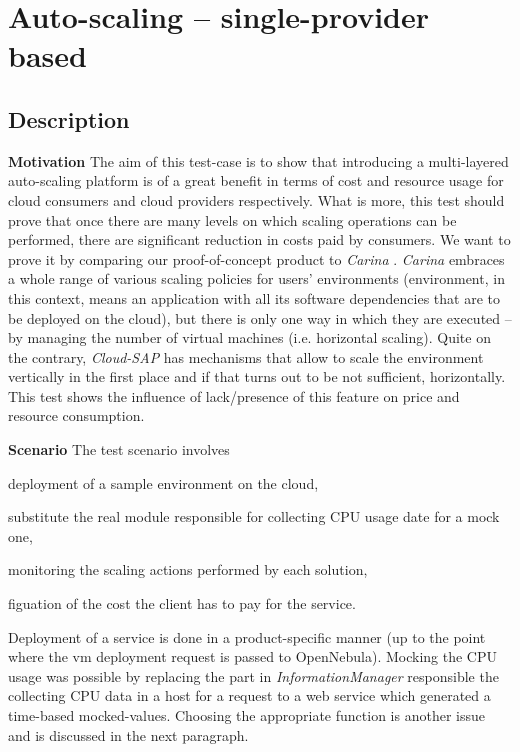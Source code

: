 \newpage
\section{Auto-scaling -- single-provider based}
\subsection*{Description}
\begin{asparaenum}
\item[\textbf{Motivation}]The aim of this test-case is to show that introducing a multi-layered auto-scaling platform is of a great benefit in terms of cost and resource usage for cloud consumers and cloud providers respectively. What is more, this test should prove that once there are many levels on which scaling operations can be performed, there are significant reduction in costs paid by consumers.
We want to prove it by comparing our proof-of-concept product to \emph{Carina} \cite{Carina}. \emph{Carina} embraces a whole range of various scaling policies for users' environments (environment, in this context, means an application with all its software dependencies that are to be deployed on the cloud), but there is only one way in which they are executed -- by managing the number of virtual machines (i.e. horizontal scaling). Quite on the contrary, \emph{Cloud-SAP} has mechanisms that allow to scale the environment vertically in the first place and if that turns out to be not sufficient, horizontally. This test shows the influence of lack/presence of this feature on price and resource consumption.
\item[\textbf{Scenario}] The test scenario involves
  \begin{inparaenum}[a)]
    \item deployment of a sample environment on the cloud,
    \item substitute the real module responsible for collecting CPU usage date for a mock one,
    \item monitoring the scaling actions performed by each solution,
    \item figuation of the cost the client has to pay for the service.
  \end{inparaenum}
  Deployment of a service is done in a product-specific manner (up to the point where the vm deployment request is passed to OpenNebula). Mocking the CPU usage was possible by replacing the part in \emph{InformationManager} responsible the collecting CPU data in a host for a request to a web service which generated a time-based mocked-values. Choosing the appropriate function is another issue and is discussed in the next paragraph.
\end{asparaenum}

